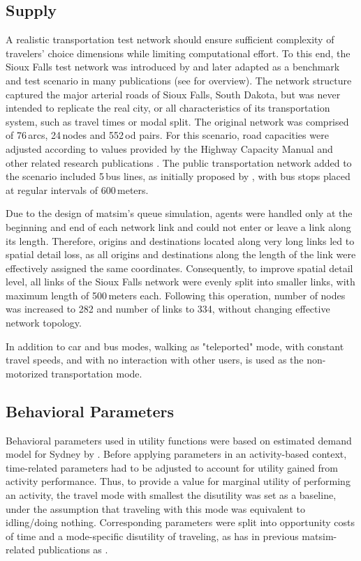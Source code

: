 \subsection{Supply} 
A realistic transportation test network should ensure sufficient complexity of travelers’ choice dimensions while limiting  computational effort. To this end, the Sioux Falls test network was introduced by \citet[][]{MorlokEtAl_ResRep_org-fhwa_1973} and later adapted as a benchmark and test scenario in many publications (see \citet[][]{ChakirovFourie_TechRep_FCL_2014} for overview). The network structure captured the major arterial roads of Sioux Falls, South Dakota, but was never intended to replicate the real city, or all characteristics of its transportation system, such as travel times or modal split. The original network was comprised of 76\,arcs, 24\,nodes and 552\,\gls{od} pairs. For this scenario, road capacities were adjusted according to values provided by the Highway Capacity Manual \citet[][]{HCM_2010} and other related research publications \citep[e.g.,][]{NgCFSmall_Transportation_2012}. The public transportation network added to the scenario included 5\,bus lines, as initially proposed by \citet[][]{AbdulaalLeBlanc_TransScience_1979}, with bus stops placed at regular intervals of 600\,meters. 

Due to the design of \gls{matsim}’s queue simulation, agents were handled only at the beginning and end of each network link and could not enter or leave a link along its length. Therefore, origins and destinations located along very long links led to spatial detail loss, as all origins and destinations along the length of the link were effectively assigned the same coordinates. Consequently, to improve spatial detail level, all links of the Sioux Falls network were evenly split into smaller links, with maximum length of 500\,meters each. Following this operation, number of nodes was increased to 282 and number of links to 334, without changing effective network topology.

In addition to car and bus modes, walking as "teleported" mode, with constant travel speeds, and with no interaction with other users, is used as the non-motorized transportation mode. 

\subsection{Behavioral Parameters}
Behavioral parameters used in utility functions were based on estimated demand model for Sydney by \citet[][]{TirachiniHensherRose_TransResB_2014}. Before applying parameters in an activity-based context, time-related parameters had to be adjusted to account for utility gained from activity performance. Thus, to provide a value for marginal utility of performing an activity, the travel mode with smallest the disutility was set as a baseline, under the assumption that traveling with this mode was equivalent to idling/doing nothing. Corresponding parameters were split into opportunity costs of time and a mode-specific disutility of traveling, as has in previous \gls{matsim}-related publications as \citet[e.g,][]{KickhoeferEtAl_Transportation_2011}. 


